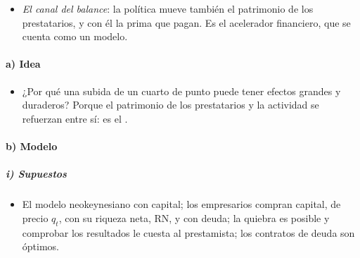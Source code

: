 \documentclass[11pt]{article}
\begin{document}
\begin{itemize}
  \begin{itemize}
  \item Actúa por la oferta de préstamos de los bancos, no por el multiplicador del dinero: los bancos no prestan las reservas, y los préstamos crean los depósitos .
  \item \emph{Evidencia}: en Estados Unidos, los bancos pequeños y con balances menos líquidos son los que más recortan el crédito tras una subida\nocite{KashyapStein2000}; en España, con las solicitudes de préstamo del registro de crédito, la subida reduce sobre todo las concesiones de los bancos con menos capital o liquidez, y las empresas rechazadas no consiguen el crédito en otro banco\nocite{JimenezEtAl2012Credit}.
  \end{itemize}
\item \emph{El canal del balance}: la política mueve también el patrimonio de los prestatarios, y con él la prima que pagan. Es el acelerador financiero, que se cuenta como un modelo.
\end{itemize}

\paragraph{a) Idea}
\begin{itemize}
\item ¿Por qué una subida de un cuarto de punto puede tener efectos grandes y duraderos? Porque el patrimonio de los prestatarios y la actividad se refuerzan entre sí: es el \nocite{BernankeGertler1989Agency,BernankeGertlerGilchrist1999}.
\end{itemize}

\paragraph{b) Modelo}

\subparagraph{i) Supuestos}
\begin{itemize}
\item El modelo neokeynesiano con capital; los empresarios compran capital, de precio $q_t$, con su riqueza neta, RN, y con deuda; la quiebra es posible y comprobar los resultados le cuesta al prestamista; los contratos de deuda son óptimos.
\end{itemize}
\end{document}
